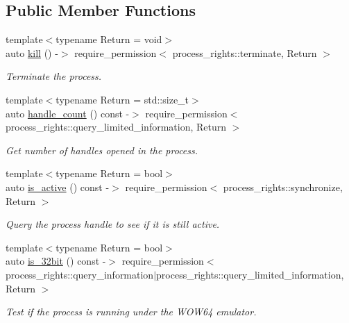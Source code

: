 \subsection*{Public Member Functions}
\begin{DoxyCompactItemize}
\item 
{\footnotesize template$<$typename Return  = void$>$ }\\auto \mbox{\hyperlink{classdistant_1_1kernel__objects_1_1process_a5740aade7f116777a17c84375b8643d2}{kill}} () -\/$>$ require\+\_\+permission$<$ process\+\_\+rights\+::terminate, Return $>$
\begin{DoxyCompactList}\small\item\em Terminate the process. \end{DoxyCompactList}\item 
{\footnotesize template$<$typename Return  = std\+::size\+\_\+t$>$ }\\auto \mbox{\hyperlink{classdistant_1_1kernel__objects_1_1process_a4db8ac7a1b08736c7b862862b02106c3}{handle\+\_\+count}} () const -\/$>$ require\+\_\+permission$<$ process\+\_\+rights\+::query\+\_\+limited\+\_\+information, Return $>$
\begin{DoxyCompactList}\small\item\em Get number of handles opened in the process. \end{DoxyCompactList}\item 
{\footnotesize template$<$typename Return  = bool$>$ }\\auto \mbox{\hyperlink{classdistant_1_1kernel__objects_1_1process_a40cfceaaded5c5f2a4c0ddc9cde8107e}{is\+\_\+active}} () const -\/$>$ require\+\_\+permission$<$ process\+\_\+rights\+::synchronize, Return $>$
\begin{DoxyCompactList}\small\item\em Query the process handle to see if it is still active. \end{DoxyCompactList}\item 
{\footnotesize template$<$typename Return  = bool$>$ }\\auto \mbox{\hyperlink{classdistant_1_1kernel__objects_1_1process_ae78ed9e64b111eee962f2fdaf59630ed}{is\+\_\+32bit}} () const -\/$>$ require\+\_\+permission$<$ process\+\_\+rights\+::query\+\_\+information$\vert$process\+\_\+rights\+::query\+\_\+limited\+\_\+information, Return $>$
\begin{DoxyCompactList}\small\item\em Test if the process is running under the W\+O\+W64 emulator. ~\newline

\end{DoxyCompactList}
\end{DoxyCompactItemize}
